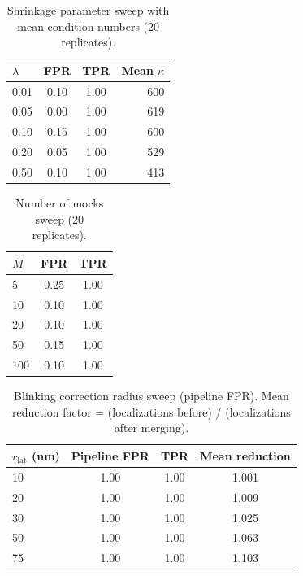 \documentclass[11pt]{article}
\begin{document}
\begin{table}[ht]
\centering
\caption{Shrinkage parameter sweep with mean condition numbers (20 replicates).}
\label{tab:s2_shrinkage}
\begin{tabular}{lccr}
\toprule
$\lambda$ & FPR & TPR & Mean $\kappa$ \\
\midrule
0.01 & 0.10 & 1.00 & 600 \\
0.05 & 0.00 & 1.00 & 619 \\
0.10 & 0.15 & 1.00 & 600 \\
0.20 & 0.05 & 1.00 & 529 \\
0.50 & 0.10 & 1.00 & 413 \\
\bottomrule
\end{tabular}
\end{table}

\begin{table}[ht]
\centering
\caption{Number of mocks sweep (20 replicates).}
\label{tab:s2_mocks}
\begin{tabular}{lcc}
\toprule
$M$ & FPR & TPR \\
\midrule
5   & 0.25 & 1.00 \\
10  & 0.10 & 1.00 \\
20  & 0.10 & 1.00 \\
50  & 0.15 & 1.00 \\
100 & 0.10 & 1.00 \\
\bottomrule
\end{tabular}
\end{table}

\begin{table}[ht]
\centering
\caption{Blinking correction radius sweep (pipeline FPR). Mean
  reduction factor = (localizations before) / (localizations after
  merging).}
\label{tab:s2_blink}
\begin{tabular}{lccc}
\toprule
$r_\mathrm{lat}$ (nm) & Pipeline FPR & TPR & Mean reduction \\
\midrule
10 & 1.00 & 1.00 & 1.001 \\
20 & 1.00 & 1.00 & 1.009 \\
30 & 1.00 & 1.00 & 1.025 \\
50 & 1.00 & 1.00 & 1.063 \\
75 & 1.00 & 1.00 & 1.103 \\
\bottomrule
\end{tabular}
\end{table}

\end{document}
